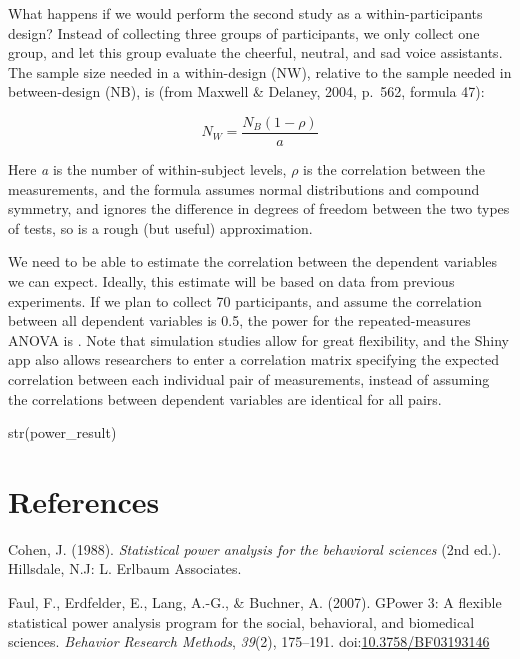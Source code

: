 \documentclass[,man,floatsintext]{apa6}
\begin{document}
What happens if we would perform the second study as a
within-participants design? Instead of collecting three groups of
participants, we only collect one group, and let this group evaluate the
cheerful, neutral, and sad voice assistants. The sample size needed in a
within-design (NW), relative to the sample needed in between-design
(NB), is (from Maxwell \& Delaney, 2004, p.~562, formula 47):

\begin{equation}
N_{W}=\frac{N_{B}(1-\rho)}{a}
\end{equation}

Here \emph{a} is the number of within-subject levels, \(\rho\) is the
correlation between the measurements, and the formula assumes normal
distributions and compound symmetry, and ignores the difference in
degrees of freedom between the two types of tests, so is a rough (but
useful) approximation.

We need to be able to estimate the correlation between the dependent
variables we can expect. Ideally, this estimate will be based on data
from previous experiments. If we plan to collect 70 participants, and
assume the correlation between all dependent variables is 0.5, the power
for the repeated-measures ANOVA is . Note that simulation studies allow
for great flexibility, and the Shiny app also allows researchers to
enter a correlation matrix specifying the expected correlation between
each individual pair of measurements, instead of assuming the
correlations between dependent variables are identical for all pairs.

str(power\_result)

\newpage

\section{References}\label{references}

\setlength{\parindent}{-0.5in} \setlength{\leftskip}{0.5in}

\hypertarget{refs}{}
\hypertarget{ref-cohen_statistical_1988}{}
Cohen, J. (1988). \emph{Statistical power analysis for the behavioral
sciences} (2nd ed.). Hillsdale, N.J: L. Erlbaum Associates.

\hypertarget{ref-faul_gpower_2007}{}
Faul, F., Erdfelder, E., Lang, A.-G., \& Buchner, A. (2007). GPower 3: A
flexible statistical power analysis program for the social, behavioral,
and biomedical sciences. \emph{Behavior Research Methods}, \emph{39}(2),
175--191.
doi:\href{https://doi.org/10.3758/BF03193146}{10.3758/BF03193146}
\end{document}
